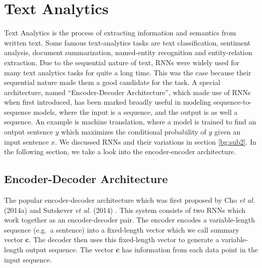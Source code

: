 


\section{Text Analytics} \label{bg:s4}

Text Analytics is the process of extracting information and semantics from written text. Some famous text-analytics tasks are text classification, sentiment analysis, document summarization, named-entity recognition and entity-relation extraction. Due to the sequential nature of text, \ac{RNN}s were widely used for many text analytics tasks for quite a long time. This was the case because their sequential nature made them a good candidate for the task. A special architecture, named \enquote{Encoder-Decoder Architecture}, which made use of \ac{RNN}s when first introduced, has been marked broadly useful in modeling sequence-to-sequence models, where the input is a sequence, and the output is as well a sequence. An example is machine translation, where a model is trained to find an output sentence $y$ which maximizes the conditional probability of $y$ given an input sentence $x$. We discussed \ac{RNN}s and their variations in section \ref{bg:sub2}. In the following section, we take a look into the encoder-encoder architecture.

\subsection{Encoder-Decoder Architecture} 
\label{bg:sub8}

The popular encoder-decoder architecture which was first proposed by Cho \textit{et al.} (2014a) \cite{cho2014learning} and Sutskever \textit{et al.} (2014) \cite{sutskever2014sequence}. This system consists of two \ac{RNNs} which work together as an encoder-decoder pair. The encoder encodes a variable-length sequence (e.g.\ a sentence) into a fixed-length vector which we call summary vector $ \mathbf{c} $. The decoder then uses this fixed-length vector to generate a variable-length output sequence. The vector $ \mathbf{c} $ has information from each data point in the input sequence.

